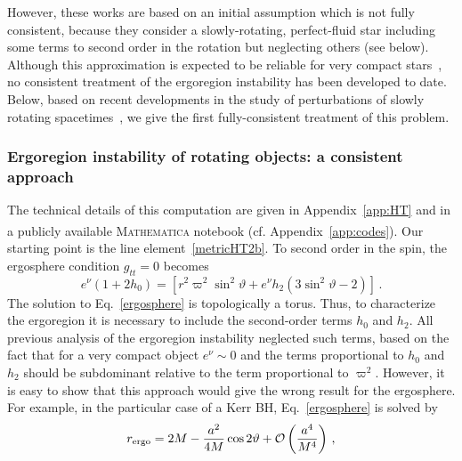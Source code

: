 \documentclass[11pt]{article}
\def\th{\vartheta}
\numberwithin{equation}{section} %
\begin{document}
However, these works are based on an initial assumption which is not fully consistent, because they consider a slowly-rotating, perfect-fluid star including some terms to second order in the rotation but neglecting others (see below). Although this approximation is expected to be reliable for very compact stars~\cite{CominsSchutz}, no consistent treatment of the ergoregion instability has been developed to date. Below, based on recent developments in the study of perturbations of slowly rotating spacetimes~\cite{Kojima:1992ie,1993ApJ...414..247K,Pani:2012bp,Pani:2013pma}, we give the first fully-consistent treatment of this problem.
\subsubsection{Ergoregion instability of rotating objects: a consistent approach \label{ergo_consistent}}
The technical details of this computation are given in Appendix~\ref{app:HT} and in a publicly available {\scshape Mathematica}\textsuperscript{\textregistered} notebook (cf. Appendix~\ref{app:codes}).
%
Our starting point is the line element~\eqref{metricHT2b}. To second order in the spin, the ergosphere condition $g_{tt}=0$ becomes
%
\begin{equation}
e^\nu (1+2h_0)=[r^2\varpi^2\sin^2\th+e^\nu h_2(3\sin^2\th-2)]\,.\label{ergosphere}
\end{equation}
%
The solution to Eq.~\eqref{ergosphere} is topologically a torus. Thus, to characterize the ergoregion it is necessary to include the second-order terms $h_0$ and $h_2$. All previous analysis of the ergoregion instability neglected such terms, based on the fact that for a very compact object $e^\nu\sim0$ and the terms proportional to $h_0$ and $h_2$ should be subdominant relative to the term proportional to $\varpi^2$. However, it is easy to show that this approach would give the wrong result for the ergosphere. For example, in the particular case of a Kerr BH, Eq.~\eqref{ergosphere} is solved by
%
\begin{equation}
r_{\rm ergo}=2M-\frac{a^2}{4M}\cos2\vartheta+{\cal O}\left(\frac{a^4}{M^4}\right)\,,\label{ergoKerr2nd}
\end{equation}
%
\end{document}
